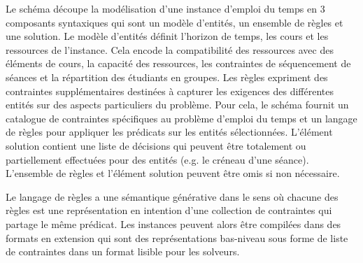 Le schéma {\UTP} découpe la modélisation %
d'une instance d'emploi du temps en 3 
composants %
syntaxiques qui sont un modèle d'entités, un ensemble de règles et une solution.
Le modèle d'entités définit l'horizon de temps, les cours et les ressources de l'instance. 
Cela encode la compatibilité des ressources avec des éléments de cours, la capacité des ressources, %
les contraintes de séquencement de séances et la répartition des étudiants en groupes.
%
%
Les règles expriment des contraintes supplémentaires destinées à capturer les exigences des différentes entités sur des aspects particuliers du problème.
%
%
Pour cela, le schéma fournit un catalogue de contraintes spécifiques au problème d'emploi du temps et un langage de règles pour appliquer les prédicats sur les entités sélectionnées.
%
L'élément solution contient une liste de décisions qui peuvent être totalement ou partiellement effectuées pour des entités (e.g. le créneau d'une séance).
%
%
L'ensemble de règles et l'élément solution peuvent être omis si non nécessaire.


Le langage de règles a une sémantique générative dans le sens où chacune des règles est une représentation en intention d'une collection de contraintes qui partage le même prédicat.
%
%
Les instances {\UTP}  peuvent alors être compilées dans des formats en extension qui sont des représentations bas-niveau sous forme de liste de contraintes dans un format lisible pour les solveurs.


